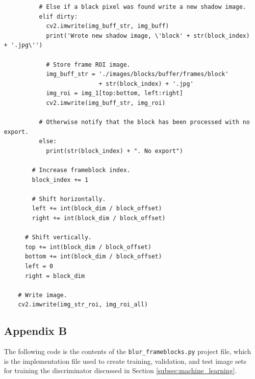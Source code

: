 \documentclass[conference]{IEEEtran}
\begin{document}
{\begin{verbatim}
          # Else if a black pixel was found write a new shadow image.
          elif dirty:
            cv2.imwrite(img_buff_str, img_buff)
            print('Wrote new shadow image, \'block' + str(block_index) + '.jpg\'')

            # Store frame ROI image.
            img_buff_str = './images/blocks/buffer/frames/block'
                           + str(block_index) + '.jpg'
            img_roi = img_1[top:bottom, left:right]
            cv2.imwrite(img_buff_str, img_roi)

          # Otherwise notify that the block has been processed with no export.
          else:
            print(str(block_index) + ". No export")

        # Increase frameblock index.
        block_index += 1
        
        # Shift horizontally.
        left += int(block_dim / block_offset)
        right += int(block_dim / block_offset)

      # Shift vertically.
      top += int(block_dim / block_offset)
      bottom += int(block_dim / block_offset)
      left = 0
      right = block_dim

    # Write image.
    cv2.imwrite(img_str_roi, img_roi_all)
\end{verbatim}
}

\pagebreak

\begin{center}
\section*{Appendix B}
\label{app:b}
\end{center}

\normalsize{
The following code is the contents of the
\texttt{blur_frameblocks.py} project file, which is the
implementation file used to create training, validation, and test image sets for
training the discriminator discussed in Section \ref{subsec:machine_learning}.
}

\bigskip
\end{document}
